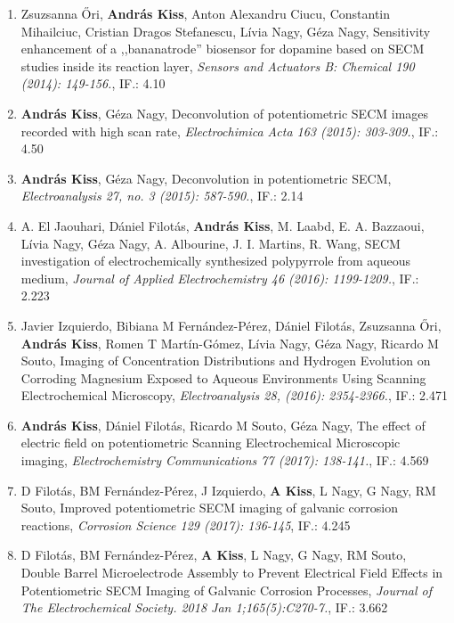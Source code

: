 \documentclass[11pt,a4paper,roman]{article}
\begin{document}
\begin{enumerate}
\item Zsuzsanna \H{O}ri, \textbf{András Kiss}, Anton Alexandru Ciucu, Constantin Mihailciuc, Cristian Dragos Stefanescu, Lívia Nagy, Géza Nagy, Sensitivity enhancement of a ,,bananatrode'' biosensor for dopamine based on SECM studies inside its reaction layer, \emph{Sensors and Actuators B: Chemical 190 (2014): 149-156.}, IF.: 4.10

\item \textbf{András Kiss}, Géza Nagy, Deconvolution of potentiometric SECM images recorded with high scan rate, \emph{Electrochimica Acta 163 (2015): 303-309.}, IF.: 4.50

\item \textbf{András Kiss}, Géza Nagy, Deconvolution in potentiometric SECM, \emph{Electroanalysis 27, no. 3 (2015): 587-590.}, IF.: 2.14

\item A. El Jaouhari,  Dániel Filotás, \textbf{András Kiss}, M. Laabd, E. A. Bazzaoui, Lívia Nagy, Géza Nagy, A. Albourine, J. I. Martins, R. Wang, SECM investigation of electrochemically synthesized polypyrrole from aqueous medium, \emph{Journal of Applied Electrochemistry 46 (2016): 1199-1209.}, IF.: 2.223

\item Javier Izquierdo, Bibiana M Fernández-Pérez, Dániel Filotás, Zsuzsanna Őri, \textbf{András Kiss}, Romen T Martín-Gómez, Lívia Nagy, Géza Nagy, Ricardo M Souto, Imaging of Concentration Distributions and Hydrogen Evolution on Corroding Magnesium Exposed to Aqueous Environments Using Scanning Electrochemical Microscopy, \emph{Electroanalysis 28, (2016): 2354-2366.}, IF.: 2.471

\item \textbf{András Kiss}, Dániel Filotás, Ricardo M Souto, Géza Nagy, The effect of electric field on potentiometric Scanning Electrochemical Microscopic imaging, \emph{Electrochemistry Communications 77 (2017): 138-141.}, IF.: 4.569

\item D Filotás, BM Fernández-Pérez, J Izquierdo, \textbf{A Kiss}, L Nagy, G Nagy, RM Souto, Improved potentiometric SECM imaging of galvanic corrosion reactions, \emph{Corrosion Science 129 (2017): 136-145}, IF.: 4.245

\item D Filotás, BM Fernández-Pérez, \textbf{A Kiss}, L Nagy, G Nagy, RM Souto, Double Barrel Microelectrode Assembly to Prevent Electrical Field Effects in Potentiometric SECM Imaging of Galvanic Corrosion Processes, \emph{Journal of The Electrochemical Society. 2018 Jan 1;165(5):C270-7.}, IF.: 3.662
\end{enumerate}
\end{document}
